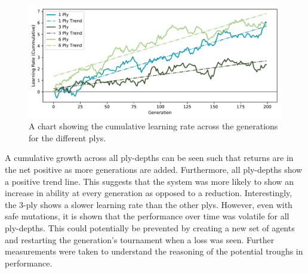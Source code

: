 \documentclass[12pt,a4paper]{article}
\begin{document}
    \begin{figure}[!ht]
        \centering
        \includegraphics[width=140mm]{images/results/combined_cummulative.pdf}
        \caption{A chart showing the cumulative learning rate across the generations for the different plys.\label{cum_growth}}
    \end{figure}
    
    A cumulative growth across all ply-depths can be seen such that returns are in the net positive as more generations are added. Furthermore, all ply-depths show a positive trend line. This suggests that the system was more likely to show an increase in ability at every generation as opposed to a reduction. Interestingly, the 3-ply shows a slower learning rate than the other plys. However, even with safe mutations, it is shown that the performance over time was volatile for all ply-depths. This could potentially be prevented by creating a new set of agents and restarting the generation's tournament when a loss was seen. Further measurements were taken to understand the reasoning of the potential troughs in performance. 
    
\end{document}
